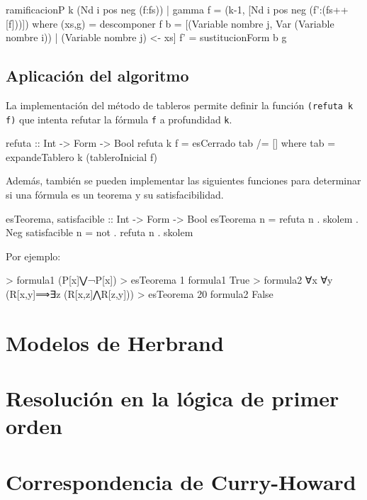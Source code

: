 \documentclass{beamer}
\begin{document}
\begin{frame}[fragile]
  \begin{code}
ramificacionP k (Nd i pos neg (f:fs))
    | gamma    f = (k-1, [Nd i pos neg (f':(fs++[f]))])
    where 
      (xs,g) = descomponer f
      b      = [(Variable nombre j, Var (Variable nombre i))
               | (Variable nombre j) <- xs]
      f'     = sustitucionForm b g
  \end{code}
\end{frame}

\subsection{Aplicación del algoritmo}

\begin{frame}[fragile]
  La implementación del método de tableros permite definir la función \texttt{(refuta k f)}
  que intenta refutar la fórmula \texttt{f} a profundidad \texttt{k}.
  \begin{code}
refuta :: Int -> Form -> Bool
refuta k f = esCerrado tab /= []
    where tab = expandeTablero k (tableroInicial f)  
  \end{code}
  Además, también se pueden implementar las siguientes funciones para determinar si una fórmula
  es un teorema y su satisfacibilidad. 
  \begin{code}
esTeorema, satisfacible :: Int -> Form -> Bool
esTeorema n = refuta n . skolem . Neg
satisfacible n = not . refuta n . skolem
\end{code}
\end{frame}

\begin{frame}[fragile]
  Por ejemplo:

\begin{code}  
> formula1
(P[x]⋁¬P[x])
> esTeorema 1 formula1
True
> formula2
∀x ∀y (R[x,y]⟹∃z (R[x,z]⋀R[z,y]))
> esTeorema 20 formula2
False
\end{code}  
\end{frame}
\section{Modelos de Herbrand}

\begin{frame}
  
\end{frame}
\section{Resolución en la lógica de primer orden}
\begin{frame}
  
\end{frame}
\section{Correspondencia de Curry-Howard}
\begin{frame}
  
\end{frame}
\end{document}
